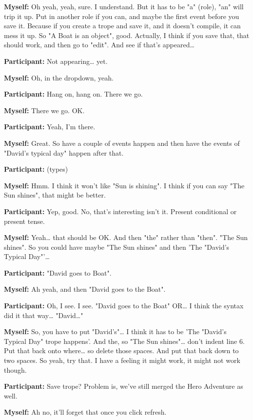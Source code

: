 \documentclass[11pt]{report}
\begin{document}
\begin{linenumbers}
\textbf{Myself:} Oh yeah, yeah, sure. I understand. But it has to be "a" (role), "an" will trip it up. Put in another role if you can, and maybe the first event before you save it. Because if you create a trope and save it, and it doesn't compile, it can mess it up. So "A Boat is an object", good. Actually, I think if you save that, that should work, and then go to "edit". And see if that's appeared\ldots{}

\textbf{Participant:} Not appearing\ldots{} yet.

\textbf{Myself:} Oh, in the dropdown, yeah.

\textbf{Participant:} Hang on, hang on. There we go.

\textbf{Myself:} There we go. OK.

\textbf{Participant:} Yeah, I'm there.

\textbf{Myself:} Great. So have a couple of events happen and then have the events of "David's typical day" happen after that.

\textbf{Participant:} (types)

\textbf{Myself:} Hmm. I think it won't like "Sun is shining". I think if you can
say "The Sun shines", that might be better.

\textbf{Participant:} Yep, good. No, that's interesting isn't it. Present conditional or present tense.

\textbf{Myself:} Yeah\ldots{} that should be OK. And then "the" rather than "then". "The Sun shines". So you could have maybe "The Sun shines" and then 'The "David's Typical Day"'\ldots{}

\textbf{Participant:} "David goes to Boat".

\textbf{Myself:} Ah yeah, and then "David goes to the Boat".

\textbf{Participant:} Oh, I see. I see. "David goes to the Boat" OR\ldots{} I think the syntax did it that way\ldots{} "David\ldots{}"

\textbf{Myself:} So, you have to put "David's"\ldots{} I think it has to be 'The "David's Typical Day" trope happens'. And the, so "The Sun shines"\ldots{} don't indent line 6. Put that back onto where\ldots{} so delete those spaces. And put that back down to two spaces. So yeah, try that. I have a feeling it might work, it might not work though.

\textbf{Participant:} Save trope? Problem is, we've still merged the Hero Adventure as well.

\textbf{Myself:} Ah no, it'll forget that once you click refresh.


\end{linenumbers}
\end{document}
